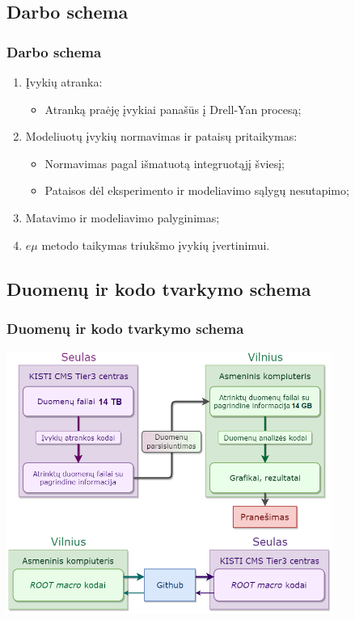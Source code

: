 \documentclass[xcolor=dvipsnames]{beamer}
\newcommand{\emu}{\mathit{e}\mu}
\begin{document}
\begin{frame}
	\section{Darbo schema}
	\frametitle{Darbo schema}
	\begin{enumerate}
		\item Įvykių atranka:
		\begin{itemize}
			\item Atranką praėję įvykiai panašūs į Drell-Yan procesą;
		\end{itemize}
		\item Modeliuotų įvykių normavimas ir pataisų pritaikymas:
		\begin{itemize}
			\item Normavimas pagal išmatuotą integruotąjį šviesį;
			\item Pataisos dėl eksperimento ir modeliavimo sąlygų nesutapimo;
		\end{itemize}
		\item Matavimo ir modeliavimo palyginimas;
		\item $\emu$ metodo taikymas triukšmo įvykių įvertinimui.
	\end{enumerate}
\end{frame}

\begin{frame}
	\section{Duomenų ir kodo tvarkymo schema}
	\frametitle{Duomenų ir kodo tvarkymo schema}
	\centering	
	\includegraphics[width=0.8\textwidth]{Duomenu_panaudojimo_schema.png}	
\end{frame}		
\end{document}
